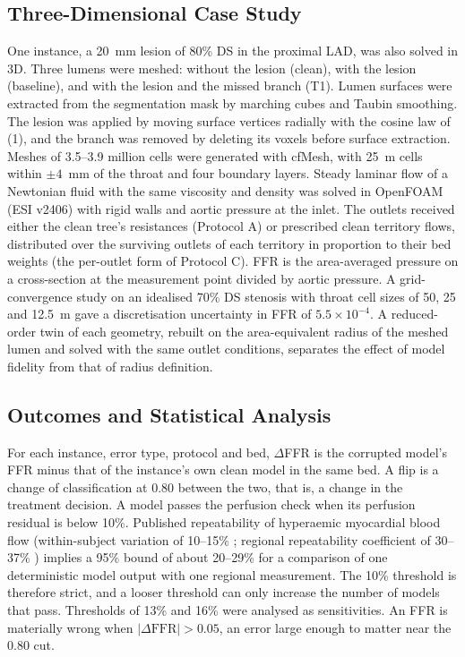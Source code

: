 \documentclass[journal]{IEEEtran}
\begin{document}
\subsection{Three-Dimensional Case Study}
One instance, a 20~mm lesion of 80\% DS in the proximal LAD, was also solved in 3D. Three lumens were meshed: without the lesion (clean), with the lesion
(baseline), and with the lesion and the missed branch (T1). Lumen surfaces were extracted from the segmentation
mask by marching cubes and Taubin smoothing. The lesion was applied by moving surface vertices radially with the
cosine law of (1), and the branch was removed by deleting its voxels before surface extraction. Meshes of 3.5--3.9
million cells were generated with cfMesh, with 25~\textmu m cells within $\pm 4$~mm of the throat and four boundary
layers. Steady laminar flow of a Newtonian fluid with the same viscosity and density was solved in OpenFOAM (ESI
v2406) with rigid walls and aortic pressure at the inlet. The outlets received either the clean tree's resistances
(Protocol A) or prescribed clean territory flows, distributed over the surviving outlets of each territory in
proportion to their bed weights (the per-outlet form of Protocol C). FFR is the area-averaged pressure on a
cross-section at the measurement point divided by aortic pressure. A grid-convergence study on an idealised 70\% DS
stenosis with throat cell sizes of 50, 25 and 12.5~\textmu m gave a discretisation uncertainty in FFR of
$5.5\times10^{-4}$. A reduced-order twin of each geometry, rebuilt on the area-equivalent radius of the meshed lumen
and solved with the same outlet conditions, separates the effect of model fidelity from that of radius definition.

\subsection{Outcomes and Statistical Analysis}
For each instance, error type, protocol and bed, $\Delta$FFR is the corrupted model's FFR minus that of the
instance's own clean model in the same bed. A flip is a change of classification at 0.80 between the two, that is,
a change in the treatment decision. A model passes the perfusion check when its perfusion residual is below 10\%.
Published repeatability of hyperaemic myocardial blood flow (within-subject variation of 10--15\% \cite{schindler2023}; regional repeatability coefficient of 30--37\% \cite{brown2018}) implies a 95\% bound of about 20--29\% for a comparison of one deterministic model output with one regional measurement. The 10\% threshold is therefore strict, and a looser
threshold can only increase the number of models that pass. Thresholds of 13\% and 16\% were analysed as
sensitivities. An FFR is materially wrong when $|\Delta\mathrm{FFR}| > 0.05$, an error large enough to matter near
the 0.80 cut.
\end{document}
